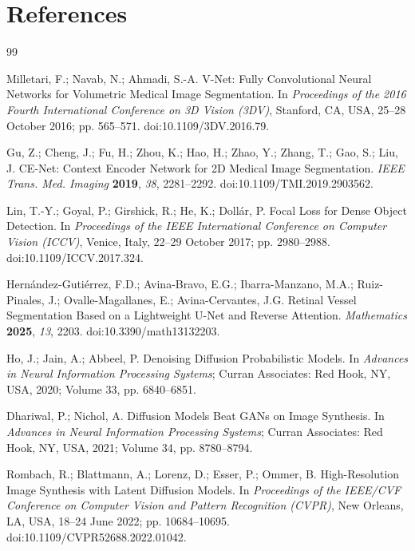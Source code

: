 \documentclass[jimaging,article,submit,pdftex,moreauthors]
  {Definitions/mdpi}
\providecommand{\href}[2]{#2}
\begin{document}
  \section*{References}
\fi
\begin{thebibliography}{99}

Milletari, F.; Navab, N.; Ahmadi, S.-A. V-Net: Fully Convolutional Neural Networks for Volumetric Medical Image Segmentation. In \textit{Proceedings of the 2016 Fourth International Conference on 3D Vision (3DV)}, Stanford, CA, USA, 25--28 October 2016; pp. 565--571. \href{https://doi.org/10.1109/3DV.2016.79}{doi:10.1109/3DV.2016.79}.

Gu, Z.; Cheng, J.; Fu, H.; Zhou, K.; Hao, H.; Zhao, Y.; Zhang, T.; Gao, S.; Liu, J. CE-Net: Context Encoder Network for 2D Medical Image Segmentation. \textit{IEEE Trans. Med. Imaging} \textbf{2019}, \textit{38}, 2281--2292. \href{https://doi.org/10.1109/TMI.2019.2903562}{doi:10.1109/TMI.2019.2903562}.

Lin, T.-Y.; Goyal, P.; Girshick, R.; He, K.; Doll\'ar, P. Focal Loss for Dense Object Detection. In \textit{Proceedings of the IEEE International Conference on Computer Vision (ICCV)}, Venice, Italy, 22--29 October 2017; pp. 2980--2988. \href{https://doi.org/10.1109/ICCV.2017.324}{doi:10.1109/ICCV.2017.324}.

Hern\'andez-Guti\'errez, F.D.; Avina-Bravo, E.G.; Ibarra-Manzano, M.A.; Ruiz-Pinales, J.; Ovalle-Magallanes, E.; Avina-Cervantes, J.G. Retinal Vessel Segmentation Based on a Lightweight U-Net and Reverse Attention. \textit{Mathematics} \textbf{2025}, \textit{13}, 2203. \href{https://doi.org/10.3390/math13132203}{doi:10.3390/math13132203}.

Ho, J.; Jain, A.; Abbeel, P. Denoising Diffusion Probabilistic Models. In \textit{Advances in Neural Information Processing Systems}; Curran Associates: Red Hook, NY, USA, 2020; Volume 33, pp. 6840--6851.

Dhariwal, P.; Nichol, A. Diffusion Models Beat GANs on Image Synthesis. In \textit{Advances in Neural Information Processing Systems}; Curran Associates: Red Hook, NY, USA, 2021; Volume 34, pp. 8780--8794.

Rombach, R.; Blattmann, A.; Lorenz, D.; Esser, P.; Ommer, B. High-Resolution Image Synthesis with Latent Diffusion Models. In \textit{Proceedings of the IEEE/CVF Conference on Computer Vision and Pattern Recognition (CVPR)}, New Orleans, LA, USA, 18--24 June 2022; pp. 10684--10695. \href{https://doi.org/10.1109/CVPR52688.2022.01042}{doi:10.1109/CVPR52688.2022.01042}.


\end{thebibliography}
\end{document}
